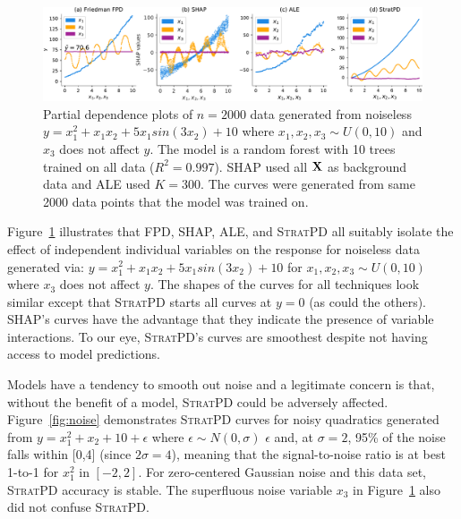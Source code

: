 \documentclass[smallextended]{svjour3}       %
\newcommand{\figref}[1]{Figure~\ref{#1}}
\newcommand{\spd}{\fontfamily{cmr}\textsc{\small StratPD}}
\begin{document}
\begin{figure}[!htbp]
\begin{center}
\includegraphics[scale=0.41]{images/interactions.pdf}\vspace{-2mm}
\caption{\small  Partial dependence plots of $n=2000$ data generated from noiseless $y = x_1^2 + x_1 x_2 + 5 x_1 sin(3 x_2) + 10$ where $x_1,x_2,x_3 \sim U(0,10)$ and $x_3$ does not affect $y$. The model is a random forest with 10 trees trained on all data ($R^2=0.997$). SHAP used all $\bf X$ as background data and ALE used $K=300$. The curves were generated from same 2000 data points that the model was trained on.}
\label{fig:interactions}
\end{center}
\end{figure}

\figref{fig:interactions} illustrates that FPD, SHAP, ALE, and \spd{} all suitably isolate the effect of independent individual variables on the response for noiseless data generated via: $y = x_1^2 + x_1 x_2 + 5 x_1 sin(3 x_2) + 10$ for $x_1,x_2,x_3 \sim U(0,10)$ where $x_3$ does not affect $y$. The shapes of the curves for all techniques look similar except that \spd{} starts all curves at $y=0$ (as could the others). SHAP's curves have the advantage that they indicate the presence of variable interactions. To our eye, \spd's curves are smoothest despite not having access to model predictions.



Models have a tendency to smooth out noise and a legitimate concern is that, without the benefit of a model, \spd{} could be adversely affected. \figref{fig:noise} demonstrates \spd{} curves for noisy quadratics generated from $y = x_1^2 + x_2 + 10 + \epsilon$ where $\epsilon \sim N(0,\sigma)$ $\epsilon$ and, at $\sigma=2$, 95\% of the noise falls within [0,4] (since $2\sigma = 4$), meaning that the signal-to-noise ratio is at best 1-to-1 for $x_1^2$ in $[-2,2]$. For zero-centered Gaussian noise and this data set, \spd{} accuracy is stable.  The superfluous noise variable $x_3$ in \figref{fig:interactions} also did not confuse \spd.
\end{document}
